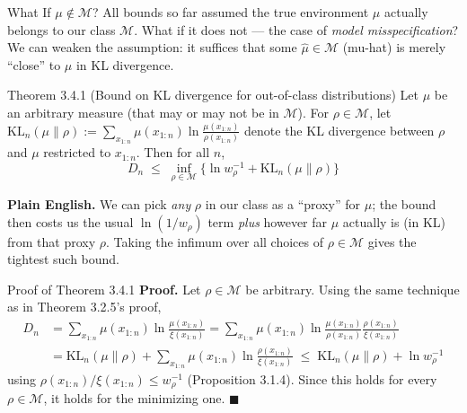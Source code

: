 \documentclass[aspectratio=169,10pt]{beamer}
\newcommand{\Mcal}{\mathcal{M}}
\newcommand{\KL}{\mathrm{KL}}
\begin{document}
\begin{frame}{What If $\mu \notin \Mcal$?}
  All bounds so far assumed the true environment $\mu$ actually belongs to
  our class $\Mcal$. What if it does not --- the case of \emph{model
  misspecification}? We can weaken the assumption: it suffices that some
  $\hat\mu \in \Mcal$ (mu-hat) is merely ``close'' to $\mu$ in KL divergence.

  \begin{block}{Theorem 3.4.1 (Bound on KL divergence for out-of-class distributions)}
    Let $\mu$ be an arbitrary measure (that may or may not be in $\Mcal$). For
    $\rho \in \Mcal$, let
    $\KL_n(\mu\|\rho) := \sum_{x_{1:n}} \mu(x_{1:n})\ln\frac{\mu(x_{1:n})}{\rho(x_{1:n})}$
    denote the KL divergence between $\rho$ and $\mu$ restricted to $x_{1:n}$.
    Then for all $n$,
    \[
      D_n \; \le \; \inf_{\rho\in\Mcal}\Big\{\ln w_\rho^{-1} + \KL_n(\mu\|\rho)\Big\}
    \]
  \end{block}
  \textbf{Plain English.} We can pick \emph{any} $\rho$ in our class as a
  ``proxy'' for $\mu$; the bound then costs us the usual $\ln(1/w_\rho)$ term
  \emph{plus} however far $\mu$ actually is (in KL) from that proxy $\rho$.
  Taking the infimum over all choices of $\rho \in \Mcal$ gives the tightest
  such bound.
\end{frame}

\begin{frame}{Proof of Theorem 3.4.1}
  \textbf{Proof.} Let $\rho \in \Mcal$ be arbitrary. Using the same technique
  as in Theorem 3.2.5's proof,
  \begin{align*}
    D_n &= \sum_{x_{1:n}} \mu(x_{1:n})\ln\frac{\mu(x_{1:n})}{\xi(x_{1:n})}
    = \sum_{x_{1:n}} \mu(x_{1:n})\ln\frac{\mu(x_{1:n})}{\rho(x_{1:n})}\frac{\rho(x_{1:n})}{\xi(x_{1:n})} \\
    &= \KL_n(\mu\|\rho) + \sum_{x_{1:n}} \mu(x_{1:n})\ln\frac{\rho(x_{1:n})}{\xi(x_{1:n})}
    \; \le \; \KL_n(\mu\|\rho) + \ln w_\rho^{-1}
  \end{align*}
  using $\rho(x_{1:n})/\xi(x_{1:n}) \le w_\rho^{-1}$ (Proposition 3.1.4). Since
  this holds for every $\rho \in \Mcal$, it holds for the minimizing one.
  $\blacksquare$
\end{frame}
\end{document}
